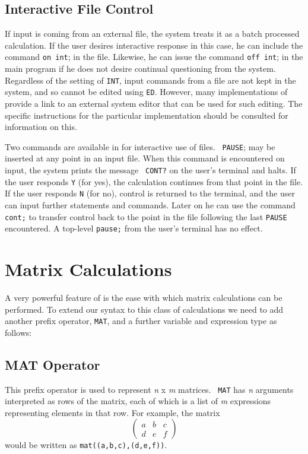 \section{Interactive File Control}
If input is coming from an external file, the system treats it as a batch
processed calculation.  If the user desires interactive
 response in this case, he can include the command
{\tt on int};  in the file.  Likewise, he can issue the
command {\tt off int}; in the main program if he does not desire continual
questioning from the system.  Regardless of the setting of {\tt INT},
input commands from a file are not kept in the system, and so cannot be
edited using {\tt ED}.  However, many implementations of {\REDUCE} provide
a link to an external system editor that can be used for such editing.
The specific instructions for the particular implementation should be
consulted for information on this.

Two commands are available in {\REDUCE} for interactive use of files. {\tt
PAUSE};  may be inserted at any point in an input file.  When
this command is encountered on input, the system prints the message {\tt
CONT?} on the user's terminal and halts.  If the user responds {\tt Y}
(for yes), the calculation continues from that point in the file.  If the
user responds {\tt N} (for no), control is returned to the terminal, and
the user can input further statements and commands.  Later on he can use
the command {\tt cont;}  to transfer control back to the
point in the file following the last {\tt PAUSE} encountered.  A top-level
{\tt pause;}  from the user's terminal has no effect.

\chapter{Matrix Calculations} 
A very powerful feature of {\REDUCE} is the ease with which matrix
calculations can be performed. To extend our syntax to this class of
calculations we need to add another prefix operator, {\tt MAT},
 and a further
variable and expression type as follows:

\section{MAT Operator} 
This prefix operator is used to represent {\em n} x {\em m} matrices. {\tt
MAT} has {\em n} arguments interpreted as rows of the matrix, each of
which is a list of {\em m} expressions representing elements in that row.
For example, the matrix
\[ \left( \begin{array}{lcr} a & b & c \\ d & e & f \end{array} \right) \]
would be written as {\tt mat((a,b,c),(d,e,f))}.


